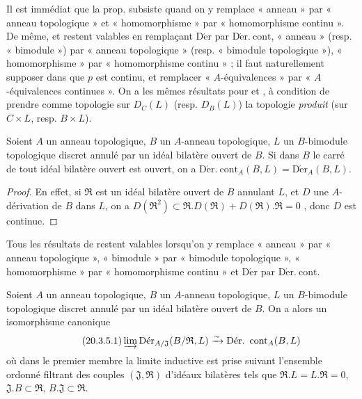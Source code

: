\begin{env}[20.3.2]
\label{0.20.3.2-fr}
Il est immédiat que la prop.  subsiste quand on y remplace
« anneau » par « anneau topologique » et « homomorphisme » par
« homomorphisme continu ». De même,  et
 restent valables en remplaçant $\operatorname{D\acute{e}r}$ par
$\operatorname{D\acute{e}r.\ cont}$, « anneau » (resp. « bimodule ») par « anneau
topologique » (resp. « bimodule topologique »), « homomorphisme » par
« homomorphisme continu » ; il faut naturellement supposer dans
 que $p$ est continu, et remplacer « $A$-équivalences » par
« $A$-équivalences continues ». On a les mêmes résultats pour
 et , à condition de prendre comme
topologie sur $D_C(L)$ (resp. $D_B(L)$) la topologie \emph{produit} (sur
$C\times L$, resp. $B\times L$).
\end{env}

\begin{proposition}[20.3.3]
\label{0.20.3.3-fr}
Soient $A$ un anneau topologique, $B$ un $A$-anneau topologique, $L$ un
$B$-bimodule topologique discret annulé par un idéal bilatère ouvert de $B$.
Si dans $B$ le carré de tout idéal bilatère ouvert est ouvert, on a
$\operatorname{D\acute{e}r.\ cont}_A(B,L)=\operatorname{D\acute{e}r}_A(B,L)$.
\end{proposition}

\begin{proof}
En effet, si $\mathfrak{R}$ est un idéal bilatère ouvert de $B$ annulant $L$,
et $D$ une $A$-dérivation de $B$ dans $L$, on a
$D(\mathfrak{R}^2)\subset\mathfrak{R}.D(\mathfrak{R})+
D(\mathfrak{R}).\mathfrak{R}=0$ , donc $D$ est continue.
\end{proof}

\begin{env}[20.3.4]
\label{0.20.3.4-fr}
Tous les résultats de  restent valables lorsqu'on y remplace
« anneau » par « anneau topologique », « bimodule » par « bimodule
topologique », « homomorphisme » par « homomorphisme continu » et
$\operatorname{D\acute{e}r}$ par $\operatorname{D\acute{e}r.\ cont}$.
\end{env}

\begin{proposition}[20.3.5]
\label{0.20.3.5-fr}
Soient $A$ un anneau topologique, $B$ un $A$-anneau topologique, $L$ un
$B$-bimodule topologique discret annulé par un idéal bilatère ouvert de $B$.
On a alors un isomorphisme canonique
\begin{equation}
\tag{20.3.5.1}
\label{0.20.3.5.1-fr}
  \varinjlim\operatorname{D\acute{e}r}_{A/\mathfrak{J}}
  (B/\mathfrak{R},L)\xrightarrow{\sim}
  \operatorname{D\acute{e}r.\ cont}_A(B,L)
\end{equation}
où dans le premier membre la limite inductive est prise suivant l'ensemble
ordonné filtrant des couples $(\mathfrak{J},\mathfrak{R})$ d'idéaux bilatères
tels que $\mathfrak{R}.L=L.\mathfrak{R}=0$,
$\mathfrak{J}.B\subset\mathfrak{R}$,
$B.\mathfrak{J}\subset\mathfrak{R}$.
\end{proposition}

